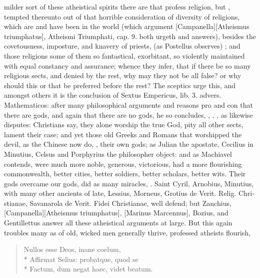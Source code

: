 {milder sort of these atheistical spirits there are that profess
religion, but , tempted thereunto out of that
horrible consideration of diversity of religions, which are and have
been in the world (which argument [Campanella][\textlatin{Atheismus triumphatus}], \textlatin{Atheismi Triumphati, cap.
9.} both urgeth and answers), besides the covetousness, imposture, and
knavery of priests,  (as Postellus observes) ; and those religions some of them so
fantastical, exorbitant, so violently maintained with equal constancy
and assurance; whence they infer, that if there be so many religious
sects, and denied by the rest, why may they not be all false? or why
should this or that be preferred before the rest? The sceptics urge
this, and amongst others it is the conclusion of Sextus Empericus, lib.
3. advers. Mathematicos: after many philosophical arguments and reasons
pro and con that there are gods, and again that there are no gods, he
so concludes, , \etc{}. , as \Tully likewise disputes: Christians say, they alone worship
the true God, pity all other sects, lament their case; and yet those
old Greeks and Romans that worshipped the devil, as the Chinese now do,
, their own gods; as Julian the apostate,
Cecilius in Minutius, Celsus and Porphyrius the philosopher
object: and as Machiavel contends, were much more noble, generous,
victorious, had a more flourishing commonwealth, better cities, better
soldiers, better scholars, better wits. Their gods overcame our gods,
did as many miracles, \etc{}. Saint Cyril, Arnobius, Minutius, with many
other ancients of late, Lessius, Morneus, Grotius \textlatin{de Verit. Relig.
Christianae}, Savanarola \textlatin{de Verit. Fidei Christianae}, well defend; but
Zanchius, [Campanella][\textlatin{Atheismus triumphatus}], [Marinus Marcennus], Bozius, and Gentillettus
answer all these atheistical arguments at large. But this again
troubles many as of old, wicked men generally thrive, professed
atheists flourish,

\begin{latin}
\begin{verse}
Nullos esse Deos, inane coelum,\\*
Affirmat Selius: probatque, quod se\\*
Factum, dum negat haec, videt beatum.
\end{verse}
\end{latin}

}
